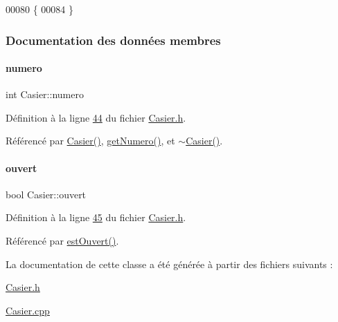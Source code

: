 \begin{DoxyCode}
00080 \{
00084 \}
\end{DoxyCode}


\subsubsection{Documentation des données membres}
\mbox{\label{class_casier_a17aa23e73b177559266a9fb17f63b812}} 
\paragraph{\texorpdfstring{numero}{numero}}
{\footnotesize\ttfamily int Casier\+::numero\hspace{0.3cm}{\ttfamily [private]}}



Définition à la ligne \hyperlink{_casier_8h_source_l00044}{44} du fichier \hyperlink{_casier_8h_source}{Casier.\+h}.



Référencé par \hyperlink{_casier_8cpp_source_l00023}{Casier()}, \hyperlink{_casier_8cpp_source_l00060}{get\+Numero()}, et \hyperlink{_casier_8cpp_source_l00050}{$\sim$\+Casier()}.

\mbox{\label{class_casier_afe544ed1a87ce714a9fbbe16126669e4}} 
\paragraph{\texorpdfstring{ouvert}{ouvert}}
{\footnotesize\ttfamily bool Casier\+::ouvert\hspace{0.3cm}{\ttfamily [private]}}



Définition à la ligne \hyperlink{_casier_8h_source_l00045}{45} du fichier \hyperlink{_casier_8h_source}{Casier.\+h}.



Référencé par \hyperlink{_casier_8cpp_source_l00070}{est\+Ouvert()}.



La documentation de cette classe a été générée à partir des fichiers suivants \+:\begin{DoxyCompactItemize}
\item 
\hyperlink{_casier_8h}{Casier.\+h}\item 
\hyperlink{_casier_8cpp}{Casier.\+cpp}\end{DoxyCompactItemize}
